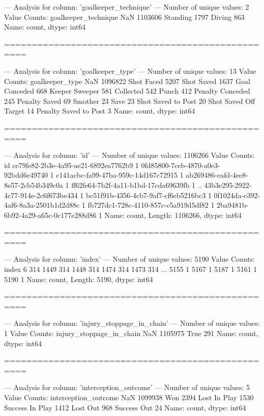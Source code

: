 --- Analysis for column: 'goalkeeper_technique' ---
Number of unique values: 2
Value Counts:
goalkeeper_technique
NaN         1103606
Standing       1797
Diving          863
Name: count, dtype: int64

==================================================

--- Analysis for column: 'goalkeeper_type' ---
Number of unique values: 13
Value Counts:
goalkeeper_type
NaN                      1096822
Shot Faced                  5207
Shot Saved                  1637
Goal Conceded                668
Keeper Sweeper               581
Collected                    542
Punch                        412
Penalty Conceded             245
Penalty Saved                 69
Smother                       23
Save                          23
Shot Saved to Post            20
Shot Saved Off Target         14
Penalty Saved to Post          3
Name: count, dtype: int64

==================================================

--- Analysis for column: 'id' ---
Number of unique values: 1106266
Value Counts:
id
ce79fe82-2b3e-4a95-ae21-6892ea7762b9    1
0fd85800-7ceb-4870-a0e3-92bdd6e49740    1
c141acbc-fa99-47ba-959c-14d167c72915    1
ab269486-eafd-4ee8-8e57-2cb54b349c0a    1
ff62fe64-7b2f-4a11-b1bd-17cda69639fb    1
                                       ..
43b3e295-2922-4c77-914e-2c6f673be434    1
bc51f91b-4356-4cb7-9af7-cf6eb5216bc3    1
0f1024da-c392-4af6-8a3a-2501b1d2d88c    1
fb727dc1-728c-4110-857c-c5a919d5df82    1
2ba9481b-6b92-4a29-a65c-0c177e288d86    1
Name: count, Length: 1106266, dtype: int64

==================================================

--- Analysis for column: 'index' ---
Number of unique values: 5190
Value Counts:
index
6       314
1449    314
1448    314
1474    314
1473    314
       ... 
5155      1
5167      1
5187      1
5161      1
5190      1
Name: count, Length: 5190, dtype: int64

==================================================

--- Analysis for column: 'injury_stoppage_in_chain' ---
Number of unique values: 1
Value Counts:
injury_stoppage_in_chain
NaN     1105975
True        291
Name: count, dtype: int64

==================================================

--- Analysis for column: 'interception_outcome' ---
Number of unique values: 5
Value Counts:
interception_outcome
NaN                1099938
Won                   2394
Lost In Play          1530
Success In Play       1412
Lost Out               968
Success Out             24
Name: count, dtype: int64

